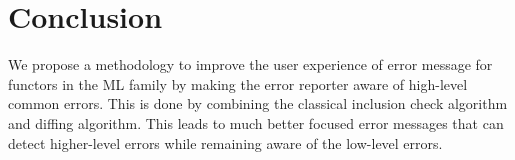 \documentclass{article}
\begin{document}
\section{Conclusion}

We propose a methodology to improve the user experience of error message for functors in the ML family by making
the error reporter aware of high-level common errors. This is done by combining the classical
inclusion check algorithm and diffing algorithm. This leads to much better focused error messages
that can detect higher-level errors while remaining aware of the low-level errors.
\end{document}
